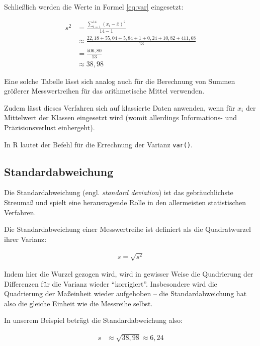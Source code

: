 \documentclass[
  11pt,
  ngerman,
  a4paper,
]{report}
\newenvironment{rtip}{
  \medskip
  \begin{tcolorbox}[colframe=purple,colback=light_gray,title=Softwarehinweis]
}{
  \end{tcolorbox}
  \medskip
}
\begin{document}
Schließlich werden die Werte in Formel \eqref{eq:var} eingesetzt:

\nopagebreak

\[\begin{aligned}
    s^2&=\frac{\sum\limits_{i=1}^{14}(x_{i}-\bar{x})^2}{14-1} \\[4pt]
       &\approx\frac{22{,}18+55{,}04+5{,}84+1+0{,}24+10{,}82+411{,}68}{13} \\[4pt]
       &=\frac{506{,}80}{13}\\[4pt]
       &\approx 38{,}98
\end{aligned}\]

Eine solche Tabelle lässt sich analog auch für die Berechnung von Summen größerer Messwertreihen für das arithmetische Mittel verwenden.

Zudem lässt dieses Verfahren sich auf klassierte Daten anwenden, wenn für \(x_i\) der Mittelwert der Klassen eingesetzt wird (womit allerdings Informations- und Präzisionsverlust einhergeht).

\begin{rtip}
In R lautet der Befehl für die Errechnung der Varianz \verb|var()|.
\end{rtip}

\hypertarget{standardabweichung}{%
\subsection{Standardabweichung}\label{standardabweichung}}

Die Standardabweichung (engl. \emph{standard deviation}) ist das gebräuchlichste Streumaß und spielt eine herausragende Rolle in den allermeisten statistischen Verfahren.

Die Standardabweichung einer Messwertreihe ist definiert als die Quadratwurzel ihrer Varianz:

\[
  \begin{aligned}
    s=\sqrt{s^2}
  \end{aligned}
  \label{eq:sd}
\]

Indem hier die Wurzel gezogen wird, wird in gewisser Weise die Quadrierung der Differenzen für die Varianz wieder \enquote{korrigiert}. Insbesondere wird die Quadrierung der Maßeinheit wieder aufgehoben -- die Standardabweichung hat also die gleiche Einheit wie die Messreihe selbst.

In unserem Beispiel beträgt die Standardabweichung also:

\[
  \begin{aligned}
    s&\approx\sqrt{38{,}98}
      \approx6{,}24
  \end{aligned}
\]
\end{document}
